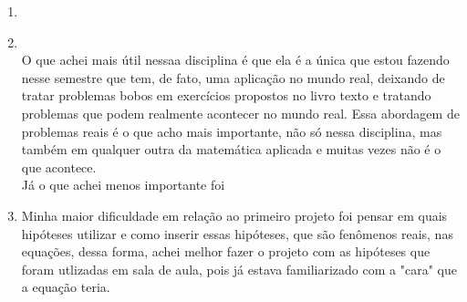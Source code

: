 \documentclass[a4paper]{article}
\begin{document}
\begin{enumerate}
$K$ \'e a capacidade de suporte do meio;\\
$M$ \'e a quantidade de indiv\'iduos que morrem por causas naturais (velhice, doen\c{c}a, cat\'astrofes, etc.).\\
\\
Os coeficientes $\alpha_1, \beta_1, \gamma_1$ representam a taxa de natalidade da espe\'ecie.\\
O efeito produzido pelo aparecimento de uma outra esp\'ecie, competi\c{c}\~ao inter-espec\'ifica, \'e proporcional ao produto dos termos das esp\'ecies multiplicado pelo fator de decrescimento da esp\'ecia presa. Neste modelo, estou supondo que o decrescimento ($\alpha_2, \beta_2, \gamma_2 $) n\~ao muda mesmo mudando a esp\'ecie predadora.\\
O coeficiente $\frac{P ^2}{K}$, onde $P$ \'e uma popula\c{c}\~ao qualquer, mede o efeito do crescimento de uma popula\c{c}\~ao pelo acr\'escimo de um novo indiv\'iduo.\\
Uma observa\c{c}\~ao relevante para a simula\c{c}\~ao do modelo \'e o valor dado aos coeficientes $\alpha$, $\beta$ e $\gamma$, pois cada esp\'ecie pode ter a capacidade de excluir a outra.\\
No caso de n\~ao existirem predadores, as presas crescem at\'e se estabilizarem devido a capacidade de suporte.\\
A popula\c{c}\~ao dos predadores diminuem na aus\^encia de presas.\\
\item
\item
\\
O que achei mais \'util nessaa disciplina \'e que ela \'e a \'unica que estou fazendo nesse semestre que tem, de fato, uma aplica\c{c}\~ao no mundo real, deixando de tratar problemas bobos em exerc\'icios propostos no livro texto e tratando problemas que podem realmente acontecer no mundo real. Essa abordagem de problemas reais \'e o que acho mais importante, n\~ao s\'o nessa disciplina, mas tamb\'em em qualquer outra da matem\'atica aplicada e muitas vezes n\~ao \'e o que acontece.
\\
J\'a o que achei menos importante foi
\item
Minha maior dificuldade em rela\c{c}\~ao ao primeiro projeto foi pensar em quais hip\'oteses utilizar e como inserir essas hip\'oteses, que s\~ao fen\^omenos reais, nas equa\c{c}\~oes, dessa forma, achei melhor fazer o projeto com as hip\'oteses que foram utlizadas em sala de aula, pois j\'a estava familiarizado com a "cara" que a equa\c{c}\~ao teria.

\end{enumerate}
\end{document}

